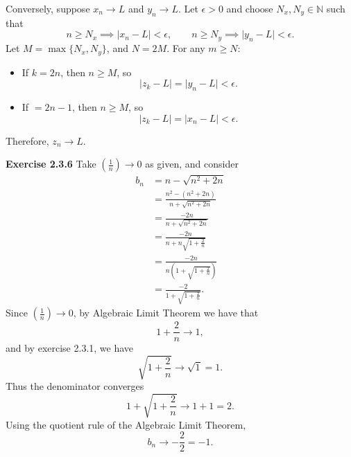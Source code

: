 \documentclass[12pt]{article}
\begin{document}
Conversely, suppose \( x_{n} \to L \) and \( y_n \to  L \). Let \( \epsilon > 0 \) and choose
\( N_x, N_y \in \mathbb{N} \) such that
\[
    n \geq N_x \implies \vert x_n - L \vert < \epsilon , \qquad n \geq N_{y} \implies  \vert y_n - L \vert < \epsilon .
\]
Let \( M = \max \{N_x, N_{y} \} \), and \( N = 2M \). For any \( m \geq N \):

\begin{itemize}
    \item If \( k = 2n \), then \( n \geq M \), so
          \[
              \vert z_k - L \vert = \vert y_n - L \vert < \epsilon .
          \]
    \item If \( = 2n - 1 \), then \( n \geq M \), so
          \[
              \vert z_k - L \vert = \vert x_n - L \vert < \epsilon .
          \]
\end{itemize}

Therefore, \( z_n \to L \).

\textbf{Exercise 2.3.6} Take \( (\frac{1}{n}) \to 0\) as given, and consider
\[
    \begin{split}
        b_n & = n - \sqrt{n^2 + 2n}                            \\
            & = \frac{n^2 - (n^2 + 2n)}{n + \sqrt{n^{2} + 2n}} \\
            & = \frac{-2n}{n + \sqrt{n^2 + 2n}}                \\
            & = \frac{-2n}{n + n \sqrt{1 + \frac{2}{n}}}       \\
            & = \frac{-2n}{n(1 + \sqrt{1 + \frac{2}{n}})}      \\
            & = \frac{-2}{1 + \sqrt{1 + \frac{2}{n}}}.
    \end{split}
\]
Since \( (\frac{1}{n}) \to 0 \), by Algebraic Limit Theorem we have that
\[
    1 + \frac{2}{n} \to  1,
\]
and by exercise 2.3.1, we have
\[
    \sqrt{1 + \frac{2}{n}} \to  \sqrt{1} = 1.
\]
Thus the denominator converges
\[
    1 + \sqrt{1 + \frac{2}{n}} \to  1 + 1 = 2.
\]
Using the quotient rule of the Algebraic Limit Theorem,
\[
    b_n \to -\frac{2}{2} = -1.
\]
\end{document}
